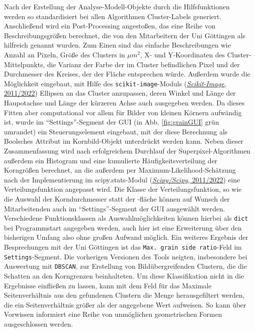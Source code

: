 \documentclass[
  12pt,
]{book}
\begin{document}
Nach der Erstellung der Analyse-Modell-Objekte durch die Hilfsfunktionen werden so standardisiert bei allen Algorithmen Cluster-Labels generiert. Anschließend wird ein Post-Processing angestoßen, das eine Reihe von Beschreibungsgrößen berechnet, die von den Mitarbeitern der Uni Göttingen als hilfreich genannt wurden. Zum Einen sind das einfache Beschreibungen wie Anzahl an Pixeln, Größe des Clusters in \(\mu m^2\), X- und Y-Koordinaten des Cluster-Mittelpunkts, die Varianz der Farbe der im Cluster befindlichen Pixel und der Durchmesser des Kreises, der der Fläche entsprechen würde. Außerdem wurde die Möglichkeit eingebaut, mit Hilfe des \texttt{scikit-image}-Moduls (\protect\hyperlink{ref-ScikitimageImageProcessing2022}{\emph{Scikit-Image}, 2011/2022}) Ellipsen an das Cluster anzupassen, deren Winkel und Länge der Haupotachse und Länge der kürzeren Achse auch ausgegeben werden. Da dieses Fitten aber computational vor allem für Bilder von kleinen Körnern aufwändig ist, wurde im ``Settings''-Segment der GUI (in Abb. \ref{fig:grainGUI} grün umrandet) ein Steuerungselement eingebaut, mit der diese Berechnung als Boolsches Attribut im Kornbild-Objekt unterdrückt werden kann.
Neben dieser Zusammenfassung wird nach erfolgreichem Durchlauf der Superpixel-Algorithmen außerdem ein Histogram und eine kumulierte Häufigkeitsverteilung der Korngrößen berechnet, an die außerdem per Maximum-Likelihood-Schätzung nach der Implementierung im scipy.stats-Modul (\protect\hyperlink{ref-ScipyScipy2022}{\emph{Scipy/Scipy}, 2011/2022}) eine Verteilungsfunktion angepasst wird. Die Klasse der Verteilungsfunktion, so wie die Auswahl der Korndurchmesser statt der -fläche können auf Wunsch der Mitarbeitenden auch im ``Settings''-Segment der GUI ausgewählt werden. Verschiedene Funktionsklassen als Auswahlmöglichkeiten können hierbei als \texttt{dict} bei Programmstart angegeben werden, auch hier ist eine Erweiterung über den bisherigen Umfang also ohne großen Aufwand möglich.
Ein weiteres Ergebnis der Besprechungen mit der Uni Göttingen ist das \texttt{Max.\ grain\ side\ ratio}-Feld im \texttt{Settings}-Segment. Die vorherigen Versionen des Tools neigten, insbesondere bei Auswertung mit \texttt{DBSCAN}, zur Erstellung von Bildübergreifenden Clustern, die die Schatten an den Korngrenzen beinhalteten. Um diese Klassifikation nicht in die Ergebnisse einfließen zu lassen, kann mit dem Feld für das Maximale Seitenverhältnis aus den gefundenen Clustern die Menge herausgefiltert werden, die ein Seitenverhältnis größer als der angegebene Wert aufweisen. So kann über Vorwissen informiert eine Reihe von unmöglichen geometrischen Formen ausgeschlossen werden.
\end{document}
